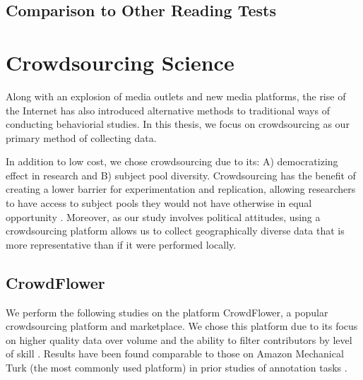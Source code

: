 \subsection{Comparison to Other Reading Tests}

\section{Crowdsourcing Science}

Along with an explosion of media outlets and new media platforms, the rise of the Internet has also introduced alternative methods to traditional ways of conducting behaviorial studies. In this thesis, we focus on crowdsourcing as our primary method of collecting data.

In addition to low cost, we chose crowdsourcing due to its: A) democratizing effect in research and B) subject pool diversity. Crowdsourcing has the benefit of creating a lower barrier for experimentation and replication, allowing researchers to have access to subject pools they would not have otherwise in equal opportunity 
\cite{mason2012conducting}. Moreover, as our study involves political attitudes, using a crowdsourcing platform allows us to collect geographically diverse data that is more representative than if it were performed locally.   

 
\subsection{CrowdFlower}

We perform the following studies on the platform CrowdFlower, a popular crowdsourcing platform and marketplace. We chose this platform due to its focus on higher quality data over volume and the ability to filter contributors by level of skill \cite{CrowdFlower-levels}. Results have been found comparable to those on Amazon Mechanical Turk (the most commonly used platform) in prior studies of annotation tasks \cite{finin2010annotating}.
